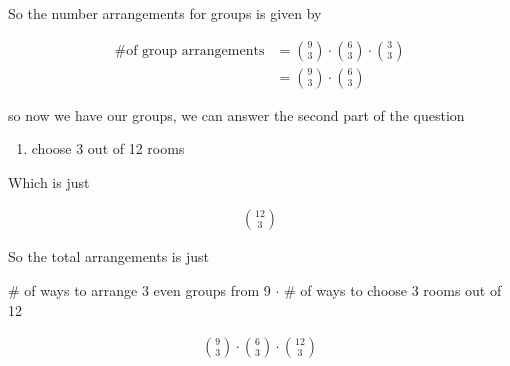 \documentclass[../Main.tex]{subfiles}
\begin{document}
\begin{alphabet}
{        So the number arrangements for groups is given by

        \begin{align*}
            \text{\# of group arrangements} &= {9 \choose 3} \cdot {6 \choose 3} \cdot {3 \choose 3} \\
            &= {9 \choose 3} \cdot {6 \choose 3}
        \end{align*}

        so now we have our groups, we can answer the second part of the question

        \begin{enumerate}
            \item choose 3 out of 12 rooms
        \end{enumerate}

        Which is just

        \begin{align*}
            {12 \choose 3}
        \end{align*}

        So the total arrangements is just

        \begin{center}
            \# of ways to arrange 3 even groups from 9 $\cdot$ \# of ways to choose 3 rooms out of 12
        \end{center}

        \begin{align*}
            \boxed{ {9 \choose 3} \cdot {6 \choose 3} \cdot {12 \choose 3} }
        \end{align*}
    }

\end{alphabet}

\end{document}
